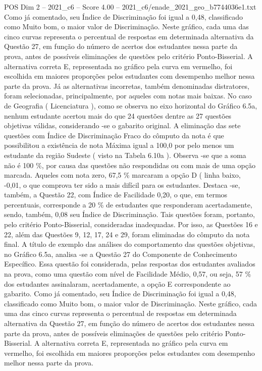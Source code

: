 \begin{textsample}{POS Dim 2 – 2021\_c6 – Score 4.00 – 2021\_c6/enade\_2021\_geo\_b7744036e1.txt}
Como já comentado, seu Índice de Discriminação foi igual a 0,48, classificado como Muito bom, o maior valor de Discriminação.
Neste gráfico, cada uma das cinco curvas representa o percentual de respostas em determinada alternativa da Questão 27, em função do número de acertos dos estudantes nessa parte da prova, antes de possíveis eliminações de questões pelo critério Ponto-Bisserial.
A alternativa correta E, representada no gráfico pela curva em vermelho, foi escolhida em maiores proporções pelos estudantes com desempenho melhor nessa parte da prova.
Já as alternativas incorretas, também denominadas distratores, foram selecionadas, principalmente, por aqueles com notas mais baixas.
No caso de Geografia ( Licenciatura ), como se observa no eixo horizontal do Gráfico 6.5a, nenhum estudante acertou mais do que 24 questões dentre as 27 questões objetivas válidas, considerando -se o gabarito original.
A eliminação das sete questões com Índice de Discriminação Fraco do cômputo da nota é que possibilitou a existência de nota Máxima igual a 100,0 por pelo menos um estudante da região Sudeste ( visto na Tabela 6.10a ).
Observa -se que a soma não é 100 \%, por causa das questões não respondidas ou com mais de uma opção marcada.
Aqueles com nota zero, 67,5 \% marcaram a opção D ( linha baixo, -0,01, o que comprova ter sido a mais difícil para os estudantes.
Destaca -se, também, a Questão 22, com Índice de Facilidade 0,20, o que, em termos percentuais, corresponde a 20 \% de estudantes que responderam acertadamente, sendo, também, 0,08 seu Índice de Discriminação.
Tais questões foram, portanto, pelo critério Ponto-Bisserial, consideradas inadequadas.
Por isso, as Questões 16 e 22, além das Questões 9, 12, 17, 24 e 29, foram eliminadas do cômputo da nota final.
A título de exemplo das análises do comportamento das questões objetivas, no Gráfico 6.5a, analisa -se a Questão 27 do Componente de Conhecimento Específico.
Essa questão foi considerada, pelas respostas dos estudantes avaliados na prova, como uma questão com nível de Facilidade Médio, 0,57, ou seja, 57 \% dos estudantes assinalaram, acertadamente, a opção E correspondente ao gabarito.
Como já comentado, seu Índice de Discriminação foi igual a 0,48, classificado como Muito bom, o maior valor de Discriminação.
Neste gráfico, cada uma das cinco curvas representa o percentual de respostas em determinada alternativa da Questão 27, em função do número de acertos dos estudantes nessa parte da prova, antes de possíveis eliminações de questões pelo critério Ponto-Bisserial.
A alternativa correta E, representada no gráfico pela curva em vermelho, foi escolhida em maiores proporções pelos estudantes com desempenho melhor nessa parte da prova.

\end{textsample}
